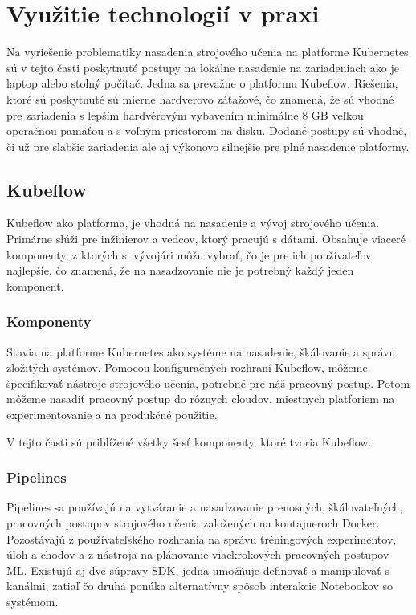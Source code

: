 
\chapter{Využitie technologií v praxi}
\label{methodology}

Na vyriešenie problematiky nasadenia strojového učenia na platforme Kubernetes sú v tejto časti poskytnuté postupy na lokálne nasadenie na zariadeniach ako je laptop alebo stolný počítač. Jedna sa prevažne o platformu Kubeflow. Riešenia, ktoré sú poskytnuté sú mierne hardverovo záťažové, čo znamená, že sú vhodné pre zariadenia s lepším hardvérovým vybavením minimálne 8 GB veľkou operačnou pamäťou a s voľným priestorom na disku. Dodané postupy sú vhodné, či už pre slabšie zariadenia ale aj výkonovo silnejšie pre plné nasadenie platformy.

\section{Kubeflow}
Kubeflow ako platforma, je vhodná na nasadenie a vývoj strojového učenia. Primárne slúži pre inžinierov a vedcov, ktorý pracujú s dátami. Obsahuje viaceré komponenty, z ktorých si vývojári môžu vybrať, čo je pre ich používateľov najlepšie, čo znamená, že na nasadzovanie nie je potrebný každý jeden komponent.

\subsection{Komponenty}

Stavia na platforme Kubernetes ako systéme na nasadenie, škálovanie a správu zložitých systémov. Pomocou konfiguračných rozhraní Kubeflow, môžeme špecifikovať nástroje strojového učenia, potrebné pre náš pracovný postup. Potom môžeme nasadiť pracovný postup do rôznych cloudov, miestnych platforiem na experimentovanie a na produkčné použitie.\cite{web}

V tejto časti sú priblížené všetky šesť komponenty, ktoré tvoria Kubeflow.


\subsection*{Pipelines}

Pipelines sa používajú na vytváranie a nasadzovanie prenosných, škálovateľných, pracovných postupov strojového učenia založených na kontajneroch Docker. Pozostávajú z používateľského rozhrania na správu tréningových experimentov, úloh a chodov a z nástroja na plánovanie viackrokových pracovných postupov ML. Existujú aj dve súpravy SDK, jedna umožňuje definovať a manipulovať s kanálmi, zatiaľ čo druhá ponúka alternatívny spôsob interakcie Notebookov so systémom.\cite{pipe}

